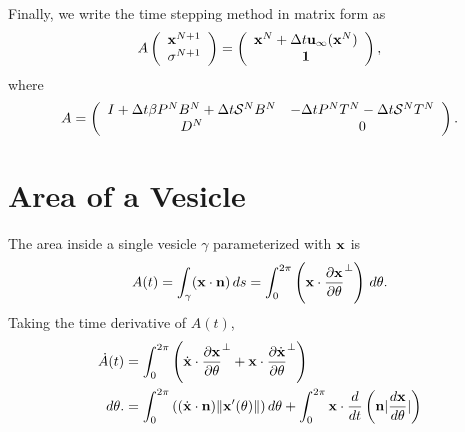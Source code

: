 \documentclass[aps,prl,showpacs]{revtex4}
\begin{document}
Finally, we write the time stepping method in matrix form as
\begin{align}
  A \left(
    \begin{array}{c}
      \mathbf{x}^{N+1} \\ \sigma^{N+1}
    \end{array}
  \right) = 
  \left(
    \begin{array}{c}
      \mathbf{x}^{N} + \Delta t \mathbf{u}_\infty(\mathbf{x}^N) \\ \mathbf{1}
    \end{array}
  \right),
\end{align}
where
\begin{align}
 A = \left(
  \begin{array}{cc}
    I + \Delta t \beta P^N B^N + \Delta t \mathcal{S}^N B^N & 
    -\Delta t P^N T^N - \Delta t \mathcal{S}^N T^N \\
    D^N & 0
  \end{array}
  \right).
\end{align}

\section{Area of a Vesicle}
The area inside a single vesicle $\gamma$ parameterized with $\mathbf{x}$ is
\begin{align}
  A(t) = \int_{\gamma} (\mathbf{x} \cdot \mathbf{n})\, ds = 
    \int_{0}^{2\pi} \left(\mathbf{x} \cdot \frac{\partial \mathbf{x}}{\partial \theta}^\perp\right)
    \, d\theta.
\end{align}
Taking the time derivative of $A(t)$,
\begin{align}
  \dot{A}(t) &= \int_{0}^{2\pi} \left(
    \dot{\mathbf{x}} \cdot \frac{\partial \mathbf{x}}{\partial \theta}^{\perp} + 
    \mathbf{x} \cdot \frac{\partial \dot{\mathbf{x}}}{\partial \theta}^{\perp}\right) \\
    \, d\theta.
  &= \int_{0}^{2\pi} \left(
    (\dot{\mathbf{x}} \cdot \mathbf{n})\|\mathbf{x}'(\theta)\| \right) d\theta +
     \int_{0}^{2\pi}
    \mathbf{x} \cdot \frac{d}{dt}\left(\mathbf{n} |\frac{d\mathbf{x}}{d\theta}| \right)
\end{align}
\end{document}
